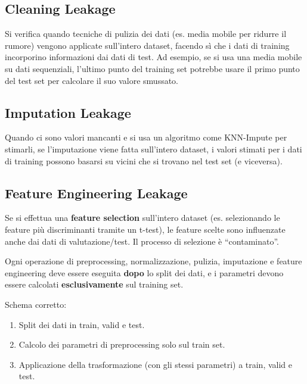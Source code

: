 \documentclass[a4paper,12pt]{article}
\begin{document}
\subsection{Cleaning Leakage}

Si verifica quando tecniche di pulizia dei dati (es. media mobile per ridurre il rumore) vengono applicate sull'intero dataset, facendo sì che i dati di training incorporino informazioni dai dati di test. Ad esempio, se si usa una media mobile su dati sequenziali, l'ultimo punto del training set potrebbe usare il primo punto del test set per calcolare il suo valore smussato.

\subsection{Imputation Leakage}

Quando ci sono valori mancanti e si usa un algoritmo come KNN-Impute per stimarli, se l'imputazione viene fatta sull'intero dataset, i valori stimati per i dati di training possono basarsi su vicini che si trovano nel test set (e viceversa).

\subsection{Feature Engineering Leakage}

Se si effettua una \textbf{feature selection} sull'intero dataset (es. selezionando le feature più discriminanti tramite un t-test), le feature scelte sono influenzate anche dai dati di valutazione/test. Il processo di selezione è ``contaminato''.

\begin{consiglio}
Ogni operazione di preprocessing, normalizzazione, pulizia, imputazione e feature engineering deve essere eseguita \textbf{dopo} lo split dei dati, e i parametri devono essere calcolati \textbf{esclusivamente} sul training set.

Schema corretto:
\begin{enumerate}[noitemsep]
    \item Split dei dati in train, valid e test.
    \item Calcolo dei parametri di preprocessing solo sul train set.
    \item Applicazione della trasformazione (con gli stessi parametri) a train, valid e test.
\end{enumerate}
\end{consiglio}
\end{document}
